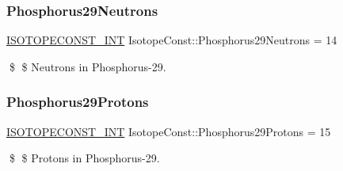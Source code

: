 \subsubsection{\texorpdfstring{Phosphorus29\+Neutrons}{Phosphorus29Neutrons}}
{\footnotesize\ttfamily \mbox{\hyperlink{group___isotope_const-_macros_ga5f18360b3e99483a35c32d789e62621c}{I\+S\+O\+T\+O\+P\+E\+C\+O\+N\+S\+T\+\_\+\+I\+NT}} Isotope\+Const\+::\+Phosphorus29\+Neutrons = 14}

\$ \$ Neutrons in Phosphorus-\/29. \mbox{\label{group___isotope_const-_phosphorus-_p29_ga3be787ab95489af7f5918413d2f99743}} 
\subsubsection{\texorpdfstring{Phosphorus29\+Protons}{Phosphorus29Protons}}
{\footnotesize\ttfamily \mbox{\hyperlink{group___isotope_const-_macros_ga5f18360b3e99483a35c32d789e62621c}{I\+S\+O\+T\+O\+P\+E\+C\+O\+N\+S\+T\+\_\+\+I\+NT}} Isotope\+Const\+::\+Phosphorus29\+Protons = 15}

\$ \$ Protons in Phosphorus-\/29. 